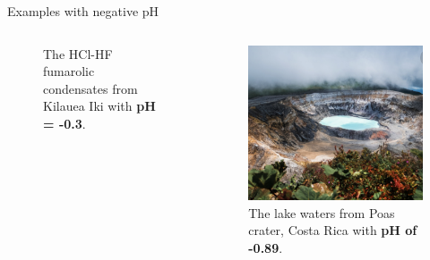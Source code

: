 \begin{frame}{Examples with negative pH}
\begin{columns}[t]
\begin{figure}
\caption*{The HCl-HF fumarolic condensates from Kilauea Iki with {\bf pH = -0.3}.}
\end{figure}
\centering
\begin{figure}
\includegraphics[width=0.9\columnwidth]{figures/chemical-equilibrium/poas.png}
\caption*{The lake waters from Poas crater, Costa Rica with {\bf pH of -0.89}.}
\end{figure}
\end{columns}



\end{frame}
